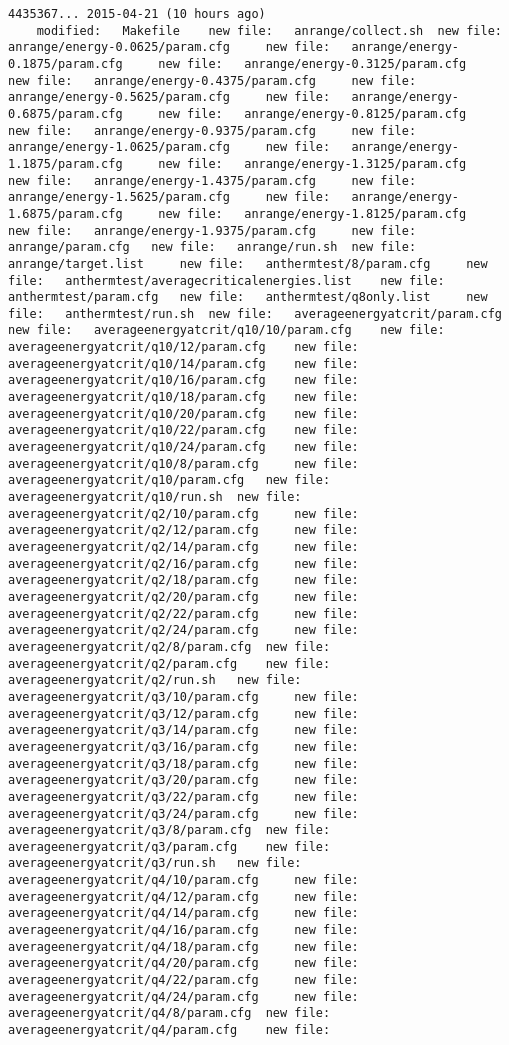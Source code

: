 \documentclass[12pt,a4paper,notitlepage,twoside]{memoir}
\begin{document}
\begin{lstlisting}[breaklines]
4435367... 2015-04-21 (10 hours ago)
	modified:   Makefile 	new file:   anrange/collect.sh 	new file:   anrange/energy-0.0625/param.cfg 	new file:   anrange/energy-0.1875/param.cfg 	new file:   anrange/energy-0.3125/param.cfg 	new file:   anrange/energy-0.4375/param.cfg 	new file:   anrange/energy-0.5625/param.cfg 	new file:   anrange/energy-0.6875/param.cfg 	new file:   anrange/energy-0.8125/param.cfg 	new file:   anrange/energy-0.9375/param.cfg 	new file:   anrange/energy-1.0625/param.cfg 	new file:   anrange/energy-1.1875/param.cfg 	new file:   anrange/energy-1.3125/param.cfg 	new file:   anrange/energy-1.4375/param.cfg 	new file:   anrange/energy-1.5625/param.cfg 	new file:   anrange/energy-1.6875/param.cfg 	new file:   anrange/energy-1.8125/param.cfg 	new file:   anrange/energy-1.9375/param.cfg 	new file:   anrange/param.cfg 	new file:   anrange/run.sh 	new file:   anrange/target.list 	new file:   anthermtest/8/param.cfg 	new file:   anthermtest/averagecriticalenergies.list 	new file:   anthermtest/param.cfg 	new file:   anthermtest/q8only.list 	new file:   anthermtest/run.sh 	new file:   averageenergyatcrit/param.cfg 	new file:   averageenergyatcrit/q10/10/param.cfg 	new file:   averageenergyatcrit/q10/12/param.cfg 	new file:   averageenergyatcrit/q10/14/param.cfg 	new file:   averageenergyatcrit/q10/16/param.cfg 	new file:   averageenergyatcrit/q10/18/param.cfg 	new file:   averageenergyatcrit/q10/20/param.cfg 	new file:   averageenergyatcrit/q10/22/param.cfg 	new file:   averageenergyatcrit/q10/24/param.cfg 	new file:   averageenergyatcrit/q10/8/param.cfg 	new file:   averageenergyatcrit/q10/param.cfg 	new file:   averageenergyatcrit/q10/run.sh 	new file:   averageenergyatcrit/q2/10/param.cfg 	new file:   averageenergyatcrit/q2/12/param.cfg 	new file:   averageenergyatcrit/q2/14/param.cfg 	new file:   averageenergyatcrit/q2/16/param.cfg 	new file:   averageenergyatcrit/q2/18/param.cfg 	new file:   averageenergyatcrit/q2/20/param.cfg 	new file:   averageenergyatcrit/q2/22/param.cfg 	new file:   averageenergyatcrit/q2/24/param.cfg 	new file:   averageenergyatcrit/q2/8/param.cfg 	new file:   averageenergyatcrit/q2/param.cfg 	new file:   averageenergyatcrit/q2/run.sh 	new file:   averageenergyatcrit/q3/10/param.cfg 	new file:   averageenergyatcrit/q3/12/param.cfg 	new file:   averageenergyatcrit/q3/14/param.cfg 	new file:   averageenergyatcrit/q3/16/param.cfg 	new file:   averageenergyatcrit/q3/18/param.cfg 	new file:   averageenergyatcrit/q3/20/param.cfg 	new file:   averageenergyatcrit/q3/22/param.cfg 	new file:   averageenergyatcrit/q3/24/param.cfg 	new file:   averageenergyatcrit/q3/8/param.cfg 	new file:   averageenergyatcrit/q3/param.cfg 	new file:   averageenergyatcrit/q3/run.sh 	new file:   averageenergyatcrit/q4/10/param.cfg 	new file:   averageenergyatcrit/q4/12/param.cfg 	new file:   averageenergyatcrit/q4/14/param.cfg 	new file:   averageenergyatcrit/q4/16/param.cfg 	new file:   averageenergyatcrit/q4/18/param.cfg 	new file:   averageenergyatcrit/q4/20/param.cfg 	new file:   averageenergyatcrit/q4/22/param.cfg 	new file:   averageenergyatcrit/q4/24/param.cfg 	new file:   averageenergyatcrit/q4/8/param.cfg 	new file:   averageenergyatcrit/q4/param.cfg 	new file:   
\end{lstlisting}
\end{document}
